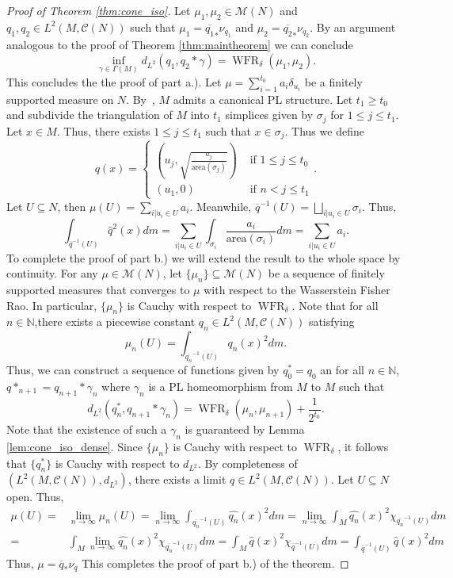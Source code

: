 \documentclass[final,hidelinks,onefignum,onetabnum]{siamart220329}
\newcommand{\WFR}{\operatorname{WFR}}
\begin{document}
\begin{proof}[Proof of Theorem \ref{thm:cone_iso}] Let $\mu_1,\mu_2\in \mathcal{M}(N)$ and $q_1,q_2\in L^2(M,\mathcal{C}(N))$ such that $\mu_{1}= \overline{q_1}_*\nu_{q_1}$ and $\mu_{2}= \overline{q_2}_*\nu_{q_2}$. By an argument analogous to the proof of Theorem \ref{thm:maintheorem} we can conclude \[\inf_{\gamma\in \Gamma(M)}d_{L^2}(q_1,q_2*\gamma)=\WFR_\delta(\mu_{1},\mu_{2}).\]
This concludes the the proof of part a.). Let $\mu=\sum_{i=1}^{t_0}a_i\delta_{u_i}$ be a finitely supported measure on $N$.  By~\cite{whitehead1940c1}, $M$ admits a canonical PL structure. Let $t_1\geq t_0$ and subdivide the triangulation of $M$ into $t_1$ simplices given by $\sigma_j$ for $1\leq j\leq t_1$. Let $x\in M$. Thus, there exists $1\leq j\leq t_1$ such that $x\in \sigma_j$. Thus we define \[q(x)=\begin{cases}\left(u_j,\sqrt{\frac{a_j}{\text{area}(\sigma_j)}}\right)&\text{ if } 1\leq j\leq t_0\\
(u_1,0)& \text{ if } n< j\leq t_1\end{cases}.\] Let $U\subseteq N$, then $\mu(U)=\sum\limits_{i|u_i\in U}a_i$. Meanwhile, $\overline{q}^{-1}(U)=\bigsqcup\limits_{i|u_i\in U}\sigma_i$. Thus, \[\int_{\overline{q}^{-1}(U)} \hat{q}^2(x)dm=\sum_{i|u_i\in U}\int_{\sigma_i} \frac{a_i}{\text{area}(\sigma_i)}dm=\sum_{i|u_i\in U}a_i.\] To complete the proof of part b.) we will extend the result to the whole space by continuity. For any $\mu\in\mathcal{M}(N)$, let $\{\mu_n\}\subseteq \mathcal{M}(N)$ be a sequence of finitely supported measures that converges to $\mu$ with respect to the Wasserstein Fisher Rao. In particular, $\{\mu_n\}$ is Cauchy with respect to $\WFR_\delta$. Note that for all $n\in\mathbb{N}$,there exists a piecewise constant $q_n\in  L^2(M,\mathcal{C}(N))$ satisfying \[\mu_n(U)=\int_{\overline{q_n}^{-1}(U)} \hat{q_n}(x)^2dm.\]
Thus, we can construct a sequence of functions given by $q^*_0=q_0$ an for all $n\in \mathbb{N}$,  $q*_{n+1}=q_{n+1}*\gamma_n$ where $\gamma_n$ is a PL homeomorphism from $M$ to $M$ such that \[d_{L^2}(q^*_n, q_{n+1}*\gamma_n)=\WFR_\delta(\mu_n,\mu_{n+1})+\frac{1}{2^{t_0}}.\]
Note that the existence of such a $\gamma_n$ is guaranteed by Lemma \ref{lem:cone_iso_dense}. Since  $\{\mu_n\}$ is Cauchy with respect to $\WFR_\delta$, it follows that $\{q^*_n\}$ is Cauchy with respect to $d_{L^2}$. By completeness of  $(L^2(M,\mathcal{C}(N)),d_{L^2})$, there exists a limit $q\in L^2(M,\mathcal{C}(N))$. Let $U\subseteq N$ open. Thus,
\begin{align*}
    \mu(U)=&\lim\limits_{n\to\infty}\mu_n(U)=\lim\limits_{n\to\infty}\int_{\overline{q_n}^{-1}(U)} \hat{q_n}(x)^2dm=\lim\limits_{n\to\infty}\int_M \hat{q_n}(x)^2\chi_{\overline{q_n}^{-1}(U)}dm\\
    =&\int_M\lim\limits_{n\to\infty} \hat{q_n}(x)^2\chi_{\overline{q_n}^{-1}(U)}dm=\int_M\hat{q}(x)^2\chi_{\overline{q}^{-1}(U)}dm=\int_{\overline{q}^{-1}(U)}\hat{q}(x)^2 dm
\end{align*}
Thus, $\mu=\overline{q}_*\nu_{q}$ This completes the proof of part b.) of the theorem.
\end{proof}
\end{document}
